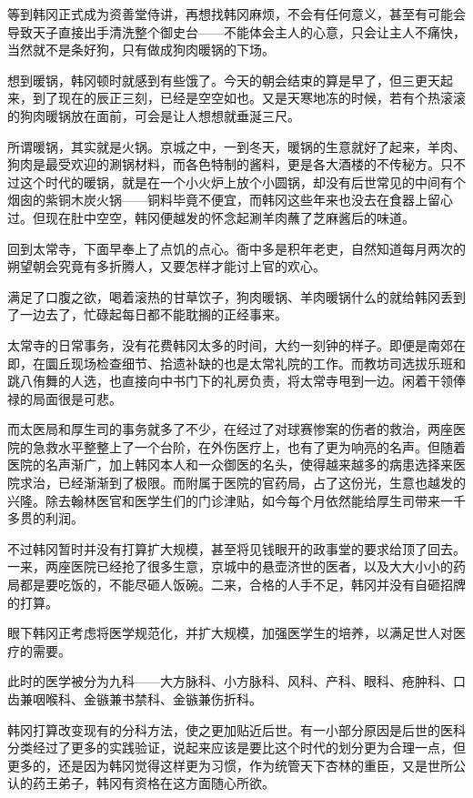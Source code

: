 等到韩冈正式成为资善堂侍讲，再想找韩冈麻烦，不会有任何意义，甚至有可能会导致天子直接出手清洗整个御史台——不能体会主人的心意，只会让主人不痛快，当然就不是条好狗，只有做成狗肉暖锅的下场。 

想到暖锅，韩冈顿时就感到有些饿了。今天的朝会结束的算是早了，但三更天起来，到了现在的辰正三刻，已经是空空如也。又是天寒地冻的时候，若有个热滚滚的狗肉暖锅放在面前，可会是让人想想就垂涎三尺。 

所谓暖锅，其实就是火锅。京城之中，一到冬天，暖锅的生意就好了起来，羊肉、狗肉是最受欢迎的涮锅材料，而各色特制的酱料，更是各大酒楼的不传秘方。只不过这个时代的暖锅，就是在一个小火炉上放个小圆锅，却没有后世常见的中间有个烟囱的紫铜木炭火锅——铜料毕竟不便宜，而韩冈这些年来也没去在食器上留心过。但现在肚中空空，韩冈便越发的怀念起涮羊肉蘸了芝麻酱后的味道。 

回到太常寺，下面早奉上了点饥的点心。衙中多是积年老吏，自然知道每月两次的朔望朝会究竟有多折腾人，又要怎样才能讨上官的欢心。 

满足了口腹之欲，喝着滚热的甘草饮子，狗肉暖锅、羊肉暖锅什么的就给韩冈丢到了一边去了，忙碌起每日都不能耽搁的正经事来。 

太常寺的日常事务，没有花费韩冈太多的时间，大约一刻钟的样子。即便是南郊在即，在圜丘现场检查细节、拾遗补缺的也是太常礼院的工作。而教坊司选拔乐班和跳八侑舞的人选，也直接向中书门下的礼房负责，将太常寺甩到一边。闲着干领俸禄的局面很是可悲。

而太医局和厚生司的事务就多了不少，在经过了对球赛惨案的伤者的救治，两座医院的急救水平整整上了一个台阶，在外伤医疗上，也有了更为响亮的名声。但随着医院的名声渐广，加上韩冈本人和一众御医的名头，使得越来越多的病患选择来医院求治，已经渐渐到了极限。而附属于医院的官药局，占了这份光，生意也越发的兴隆。除去翰林医官和医学生们的门诊津贴，如今每个月依然能给厚生司带来一千多贯的利润。 

不过韩冈暂时并没有打算扩大规模，甚至将见钱眼开的政事堂的要求给顶了回去。一来，两座医院已经抢了很多生意，京城中的悬壶济世的医者，以及大大小小的药局都是要吃饭的，不能尽砸人饭碗。二来，合格的人手不足，韩冈并没有自砸招牌的打算。 

眼下韩冈正考虑将医学规范化，并扩大规模，加强医学生的培养，以满足世人对医疗的需要。 

此时的医学被分为九科——大方脉科、小方脉科、风科、产科、眼科、疮肿科、口齿兼咽喉科、金镞兼书禁科、金镞兼伤折科。 

韩冈打算改变现有的分科方法，使之更加贴近后世。有一小部分原因是后世的医科分类经过了更多的实践验证，说起来应该是要比这个时代的划分更为合理一点，但更多的，还是因为韩冈觉得这样更为习惯，作为统管天下杏林的重臣，又是世所公认的药王弟子，韩冈有资格在这方面随心所欲。 

